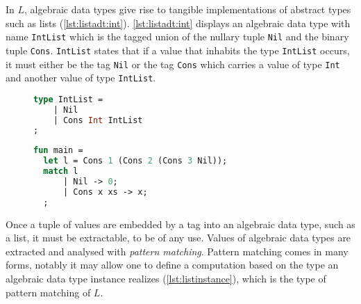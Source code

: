 In $L$, algebraic data types give rise to tangible implementations of abstract types such as lists (\autoref{lst:listadt:int}).
\autoref{lst:listadt:int} displays an algebraic data type with name \texttt{IntList} which is the tagged union of the nullary tuple \texttt{Nil} and the binary tuple \texttt{Cons}.
\texttt{IntList} states that if a value that inhabits the type \texttt{IntList} occurs, it must either be the tag \texttt{Nil} or the tag \texttt{Cons} which carries a value of type \texttt{Int} and another value of type \texttt{IntList}.
\begin{figure}
\begin{lstlisting}[language=ML,caption={List algebraic data type},label={lst:listadt:int}]
type IntList = 
    | Nil
    | Cons Int IntList
;
\end{lstlisting}
\end{figure}
\begin{figure}
\begin{lstlisting}[language=ML,caption={List instance and match},label={lst:listinstance}]
fun main =
  let l = Cons 1 (Cons 2 (Cons 3 Nil));
  match l 
      | Nil -> 0;
      | Cons x xs -> x;
  ;
\end{lstlisting}
\end{figure}
Once a tuple of values are embedded by a tag into an algebraic data type, such as a list, it must be extractable, to be of any use.
Values of algebraic data types are extracted and analysed with \textit{pattern matching}.
Pattern matching comes in many forms, notably it may allow one to define a computation based on the type an algebraic data type instance realizes (\autoref{lst:listinstance}), which is the type of pattern matching of $L$.


